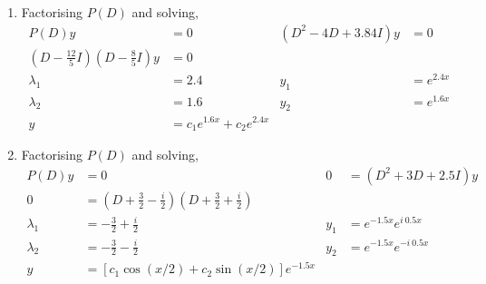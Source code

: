 \begin{enumerate}
    \item Factorising $ P(D) $ and solving,
          \begin{align}
              P(D)y                 & = 0                             &
              (D^{2} - 4D + 3.84I)y & = 0                               \\
              \left( D - \frac{12}{5}I \right) \left( D - \frac{8}{5}I \right)y
                                    & = 0                               \\
              \lambda_{1}           & = 2.4                           &
              y_{1}                 & = e^{2.4x}                        \\
              \lambda_{2}           & = 1.6                           &
              y_{2}                 & = e^{1.6x}                        \\
              y                     & = c_{1}e^{1.6x} + c_{2}e^{2.4x}
          \end{align}

    \item Factorising $ P(D) $ and solving,
          \begin{align}
              P(D)y       & = 0                                            &
              0           & = (D^{2} + 3D + 2.5I)y                           \\
              0           & = \left( D + \frac{3}{2} - \frac{i}{2} \right)
              \left( D + \frac{3}{2} + \frac{i}{2} \right)                   \\
              \lambda_{1} & = - \frac{3}{2} + \frac{i}{2}                  &
              y_{1}       & = e^{-1.5x}e^{i\ 0.5x}                           \\
              \lambda_{2} & = - \frac{3}{2} - \frac{i}{2}                  &
              y_{2}       & = e^{-1.5x}e^{-i\ 0.5x}                          \\
              y           & = [c_{1}\cos(x/2) + c_{2}\sin(x/2)]e^{-1.5x}
          \end{align}


\end{enumerate}
